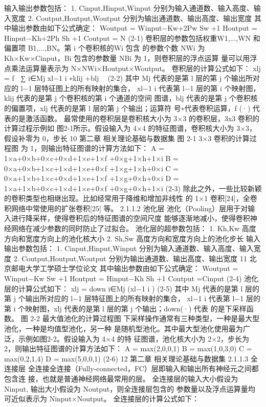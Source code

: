 输入输出参数包括：
1. Cinput,Hinput,Winput 分别为输入通道数、输入高度、输入宽度
2. Coutput,Houtput,Woutput 分别为输出通道数、输出高度、输出宽度
其中输出参数由如下公式确定：
Woutput =
Winput−Kw+2Pw Sw
+1
Houtput =
Hinput−Kh+2Ph Sh
+1
Coutput = N
(2-1)
卷积层的参数包括权重W1,...,WN 和偏置项 B1,...,BN。第 i 个卷积核的Wi 包含 的参数个数 NWi 为 Kh×Kw×Cinput，Bi 包含的参数量 NBi 为 1，则卷积层的浮点运算 量可以用浮点乘法运算量表示为 N×NWi×Houtput×Woutput。 卷积层的计算公式如下： xlj = f ∑ i∈Mj xl−1 i ∗klij +blj  (2-2) 其中 Mj 代表的是第 l 层的第 j 个输出所对应的 l−1 层特征图上的所有映射的集合， xl−1 i 代表第 l−1 层的第 i 个映射图，klij 代表的是第 j 个卷积核的第 i 个通道的空间 图谱，blj 代表的是第 j 个卷积核的偏置项，xlj 代表的是第 l 层的第 j 个输出；运算符 号∗代表卷积运算，f (·) 代表的是激活函数。 最常使用的卷积层是卷积核大小为 3×3 的卷积层，3x3 卷积的计算过程示例如 图2-1所示。假设输入为 4×4 的特征图谱，卷积核大小为 3×3，假设补零为 0，步长
10
第二章 相关理论基础与数据集
图 2-1 3×3 卷积的计算过程图 为 1，则输出特征图谱的计算方法如下： A = 1×a+0×b+0×c+0×d+1×e+1×f +0×g+1×h+1×i B = 0×a+0×b+1×c+1×d+1×e+0×f +1×g+1×h+0×i C = 0×a+1×b+1×c+0×d+1×e+1×f +1×g+0×h+0×i D = 1×a+1×b+0×c+1×d+1×e+0×f +0×g+0×h+1×i
(2-3)
除此之外，一些比较新颖的卷积类型也相继出现。比如经常用于降维和增加非线性 的 1×1 卷积[24]，全卷积网络中常使用的扩张卷积[25] 等。
2.1.1.2 池化层 池化（Pooling）层用于对输入进行降采样，使得卷积后的特征图谱的空间尺度 能够逐渐地减小，使得卷积神经网络在减少参数的同时防止了过拟合。 池化层的超参数包括：
1. Kh,Kw 高度方向和宽度方向上的池化核大小 2. Sh,Sw 高度方向和宽度方向上的池化步长
输入输出参数包括：
1. Cinput,Hinput,Winput 分别为输入通道数、输入高度、输入宽度 2. Coutput,Houtput,Woutput 分别为输出通道数、输出高度、输出宽度
11
北京邮电大学工学硕士学位论文
其中输出参数由如下公式确定：
Woutput =
Winput−Kw Sw
+1
Houtput =
Hinput−Kh Sh
+1
Coutput =Cinput
(2-4)
池化层的计算公式如下：
xlj = down i∈Mj (xl−1 i ) (2-5) 其中 Mj 代表的是第 l 层的第 j 个输出所对应的 l−1 层特征图上的所有映射的集合， xl−1 i 代表第 l−1 层的第 i 个映射图，xlj 代表的是第 l 层的第 j 个输出；down(·) 代表 的是下采样函数。
图 2-2 最大值池化的计算过程图
下采样操作通常有三种类型，一种是最大型池化，一种是均值型池化，另一种 是随机型池化。其中最大型池化使用最为广泛，示例如图2-2。假设输入为 4×4 的特 征图谱，池化核大小为 2×2，步长为 2，则输出特征图谱的计算方法如下： A = max(2,0,0,1) B = max(1,0,3,0) C = max(0,2,1,4) D = max(5,0,0,1) (2-6)
12
第二章 相关理论基础与数据集
2.1.1.3 全连接层
全连接全连接（Fully-connected，FC）层即输入和输出所有神经元之间都包含连 接，也就是普通神经网络最常用的层。 全连接层的输入大小假设为 Ninput, 输出大小假设为 Noutput，则全连接层包含的 参数量以及浮点运算量均可近似表示为 Ninput×Noutput。 全连接层的计算公式如下：
